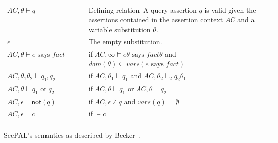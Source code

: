 \documentclass[thesis.tex]{subfiles}
\begin{document}
\begin{figure}\centering
  \begin{tabular}{l p{0.7\linewidth}}
    \toprule
    $AC,\theta \vdash q$                     & Defining relation. A query assertion $q$ is valid given the assertions contained in the assertion context $AC$ and a variable substitution $\theta$. \\
    $\epsilon$                               & The empty substitution.                                                                                                                              \\
    \midrule
    $AC,\theta \vdash e \text{ says } fact$  & if $AC,\infty \models e\theta \text{ says } fact\theta$ and $dom(\theta) \subseteq vars(e \text{ says } fact)$                                       \\
    $AC,\theta_1\theta_2 \vdash q_1, q_2$    & if $AC,\theta_1 \vdash q_1$ and $AC,\theta_2 \vdash_2 q_2\theta_1$                                                                                   \\
    $AC,\theta \vdash q_1 \text{ or } q_2$   & if $AC,\theta \vdash q_1$ or $AC,\theta \vdash q_2$                                                                                                  \\
    $AC,\epsilon \vdash \mathsf{not}(q)$     & if $AC,\epsilon \not\vdash q$ and $vars(q) = \emptyset$                                                                                              \\
    $AC,\epsilon \vdash c$                   & if $\models c$                                                                                                                                       \\
    \bottomrule                             \\
  \end{tabular}
  \caption[SecPAL's semantics.]{SecPAL's semantics as described by Becker~\cite{becker_secpal:_2010}.}
\end{figure}
\end{document}
